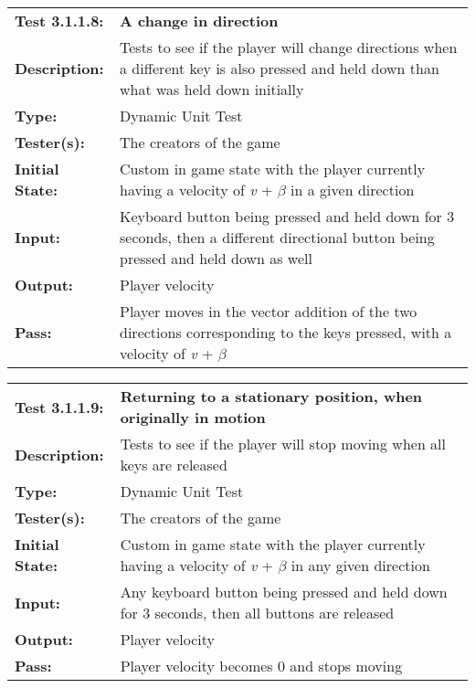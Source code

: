 \documentclass[12pt, titlepage]{article}
\begin{document}
\begin{mdframed}[linewidth=1pt]
\begin{tabularx}{\textwidth}{@{}p{3cm}X@{}}
{\bf Test 3.1.1.8:} & {\bf A change in direction}\\[\baselineskip]
{\bf Description:} & Tests to see if the player will change directions when a different key is also pressed and held down than what was held down initially\\[0.5\baselineskip]
{\bf Type:} & Dynamic Unit Test\\[0.5\baselineskip]
{\bf Tester(s):} & The creators of the game\\[0.5\baselineskip]
{\bf Initial State:} & Custom in game state with the player currently having a velocity of \textit{v} + $\beta$ in a given direction\\[0.5\baselineskip]
{\bf Input:} & Keyboard button being pressed and held down for 3 seconds, then a different directional button being pressed and held down as well \\[0.5\baselineskip]
{\bf Output:} & Player velocity\\[0.5\baselineskip]
{\bf Pass:} & Player moves in the vector addition of the two directions corresponding to the keys pressed, with a velocity of \textit{v} + $\beta$
\end{tabularx}
\end{mdframed}

\begin{mdframed}[linewidth=1pt]
\begin{tabularx}{\textwidth}{@{}p{3cm}X@{}}
{\bf Test 3.1.1.9:} & {\bf Returning to a stationary position, when originally in motion}\\[\baselineskip]
{\bf Description:} & Tests to see if the player will stop moving when all keys are released\\[0.5\baselineskip]
{\bf Type:} & Dynamic Unit Test\\[0.5\baselineskip]
{\bf Tester(s):} & The creators of the game\\[0.5\baselineskip]
{\bf Initial State:} & Custom in game state with the player currently having a velocity of \textit{v} + $\beta$ in any given direction\\[0.5\baselineskip]
{\bf Input:} & Any keyboard button being pressed and held down for 3 seconds, then all buttons are released \\[0.5\baselineskip]
{\bf Output:} & Player velocity\\[0.5\baselineskip]
{\bf Pass:} & Player velocity becomes 0 and stops moving
\end{tabularx}
\end{mdframed}
\end{document}
